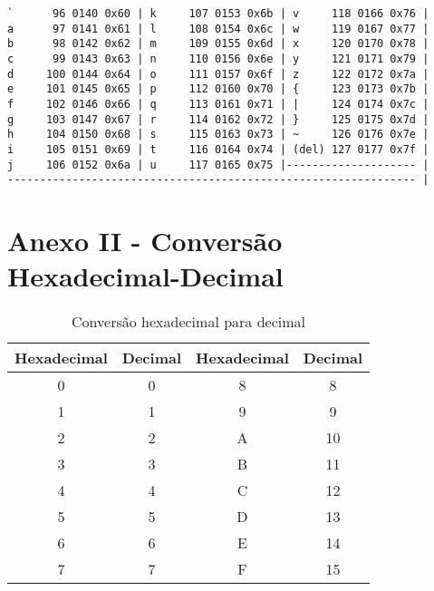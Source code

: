 \begin{verbatim}
`      96 0140 0x60 | k     107 0153 0x6b | v     118 0166 0x76 |
a      97 0141 0x61 | l     108 0154 0x6c | w     119 0167 0x77 |
b      98 0142 0x62 | m     109 0155 0x6d | x     120 0170 0x78 |
c      99 0143 0x63 | n     110 0156 0x6e | y     121 0171 0x79 |
d     100 0144 0x64 | o     111 0157 0x6f | z     122 0172 0x7a |
e     101 0145 0x65 | p     112 0160 0x70 | {     123 0173 0x7b |
f     102 0146 0x66 | q     113 0161 0x71 | |     124 0174 0x7c |
g     103 0147 0x67 | r     114 0162 0x72 | }     125 0175 0x7d |
h     104 0150 0x68 | s     115 0163 0x73 | ~     126 0176 0x7e |
i     105 0151 0x69 | t     116 0164 0x74 | (del) 127 0177 0x7f |
j     106 0152 0x6a | u     117 0165 0x75 |-------------------- |
--------------------------------------------------------------- |
\end{verbatim}

\section{Anexo II - Conversão Hexadecimal-Decimal}

\begin{table}[h]
\center\begin{tabular}{|c|c|c|c|}
\hline
\textbf{Hexadecimal} & \textbf{Decimal} & \textbf{Hexadecimal} & \textbf{Decimal} \\ \hline
0                    & 0                & 8                    & 8                \\ \hline
1                    & 1                & 9                    & 9                \\ \hline
2                    & 2                & A                    & 10               \\ \hline
3                    & 3                & B                    & 11               \\ \hline
4                    & 4                & C                    & 12               \\ \hline
5                    & 5                & D                    & 13               \\ \hline
6                    & 6                & E                    & 14               \\ \hline
7                    & 7                & F                    & 15               \\ \hline
\end{tabular}
\caption{Conversão hexadecimal para decimal}
\end{table}
